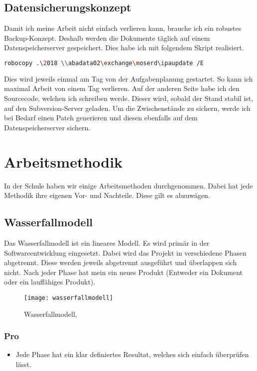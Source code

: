 \subsection{Datensicherungskonzept}
Damit ich meine Arbeit nicht einfach verlieren kann, brauche ich ein robustes Backup-Konzept. Deshalb werden die Dokumente täglich auf einem Datenspeicherserver gespeichert. Dies habe ich mit folgendem Skript realisiert.
\begin{lstlisting}[language=bash]
robocopy .\2018 \\abadata02\exchange\moserd\ipaupdate /E
\end{lstlisting}
Dies wird jeweils einmal am Tag von der Aufgabenplanung gestartet. So kann ich maximal Arbeit von einem Tag verlieren. Auf der anderen Seite habe ich den Sourcecode, welchen ich schreiben werde. Dieser wird, sobald der Stand stabil ist, auf den Subversion-Server geladen. Um die Zwischenstände zu sichern, werde ich bei Bedarf einen Patch generieren und diesen ebenfalls auf dem Datenspeicherserver sichern.

\section{Arbeitsmethodik} \label{Arbeitsmethodik}
In der Schule haben wir einige Arbeitsmethoden durchgenommen. Dabei hat jede Methodik ihre eigenen Vor- und Nachteile. Diese gilt es abzuwägen. 
\subsection{Wasserfallmodell}
Das Wasserfallmodell ist ein lineares Modell. Es wird primär in der Softwareentwicklung eingesetzt. Dabei wird das Projekt in verschiedene Phasen abgetrennt. Diese werden jeweils abgetrennt ausgeführt und überlappen sich nicht. Nach jeder Phase hat mein ein neues Produkt (Entweder ein Dokument oder ein lauffähiges Produkt).
\begin{figure}[H]
	\centering
	\texttt{[image: wasserfallmodell]}
	\caption{Wasserfallmodell, \protect{}}
\end{figure}
\subsubsection{Pro}
\begin{itemize}
\item Jede Phase hat ein klar definiertes Resultat, welches sich einfach überprüfen lässt.
\end{itemize}
